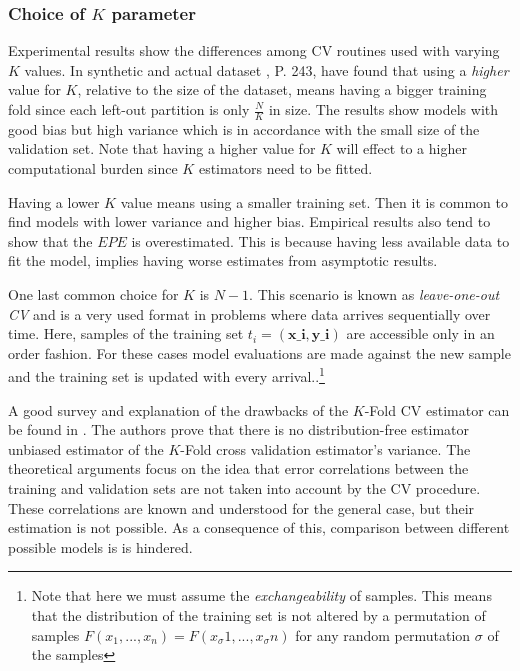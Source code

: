 \subsubsection{Choice of $K$ parameter} 

Experimental results show the differences among CV routines used with varying $K$ values. In synthetic and actual dataset , \cite{hastie-elemstatslearn} P. 243, have found that using a \textit{higher} value for $K$, relative to the size of the dataset, means having a bigger training fold since each left-out partition is only $\frac{N}{K}$ in size. The results show models with good bias but high variance which is in accordance with the small size of the validation set. Note that having a higher value for $K$ will effect to a higher computational burden since $K$ estimators need to be fitted.

Having a lower $K$ value means using a smaller training set. Then it is common to find models with lower variance and higher bias. Empirical results also tend to show that the $EPE$ is overestimated. This is because having less available data to fit the model, implies having worse estimates from asymptotic results.
 
One last common choice for $K$ is $N-1$. This scenario is known as \textit{leave-one-out CV} and is a very used format in problems where data arrives sequentially over time. Here, samples of the training set $t_i = (\textbf{x_i},\textbf{y_i})$ are accessible only in an order fashion. For these cases model evaluations are made against the new sample and the training set is updated with every arrival..\footnote{Note that here we must assume the \textit{exchangeability} of samples. This means that the distribution of the training set is not altered by a permutation of samples $F(x_1,...,x_n ) = F(x_\sigma{1},...,x_\sigma{n})$ for any random permutation $\sigma$ of the samples  }
 

A good survey and explanation of the drawbacks of the $K$-Fold CV estimator can be found in \cite{bengio-unbiasedCvEstimator}. The authors prove that there is no distribution-free estimator unbiased estimator of the $K$-Fold cross validation estimator's variance. The theoretical arguments focus on the idea that error correlations between the training and validation sets are not taken into account by the CV procedure. These correlations are known and understood for the general case, but their estimation is not possible. As a consequence of this, comparison between different possible models is is hindered. 

